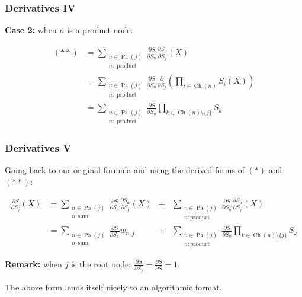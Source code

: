 \documentclass{beamer}
\DeclareMathOperator*{\Ch}{\text{Ch}}
\DeclareMathOperator*{\Pa}{\text{Pa}}
\newcommand{\ddspn}[2]{\frac{\partial#1}{\partial#2}}
\begin{document}
\begin{frame}
  \frametitle{Derivatives IV}

  \textbf{Case 2:} when $n$ is a product node.

  \begin{align*}
    (\ast\ast)&=\sum_{\substack{n\in\Pa(j)\\n:\text{ product}}}\ddspn{S}{S_n}\ddspn{S_n}{S_j}(X)\\
      &=\sum_{\substack{n\in\Pa(j)\\n:\text{ product}}}\ddspn{S}{S_n}\ddspn{}{S_j}\left(\prod_{i\in\Ch(n)}
      S_i(X)\right)\\
      &=\sum_{\substack{n\in\Pa(j)\\n:\text{ product}}}\ddspn{S}{S_n}\prod_{k\in
      \Ch(n)\setminus\{j\}}S_k
  \end{align*}
\end{frame}

\begin{frame}
  \frametitle{Derivatives V}

  Going back to our original formula and using the derived forms of $(\ast)$ and $(\ast\ast)$:

  \begin{align*}
    \ddspn{S}{S_j}(X)&=\sum_{\substack{n\in\Pa(j)\\n:\text{
          sum}}}\ddspn{S}{S_n}\ddspn{S_n}{S_j}(X)&+&\sum_{\substack{n\in\Pa(j)\\n:\text{
      product}}}\ddspn{S}{S_n}\ddspn{S_n}{S_j}(X)\\
                     &=\sum_{\substack{n\in\Pa(j)\\n:\text{
          sum}}}\ddspn{S}{S_n}w_{n,j}&+&\sum_{\substack{n\in\Pa(j)\\n:\text{
                       product}}}\ddspn{S}{S_n}\prod_{k\in \Ch(n)\setminus\{j\}}S_k
  \end{align*}

  \begin{center}
    \textbf{Remark:} when $j$ is the root node: $\ddspn{S}{S_j}=\ddspn{S}{S}=1$.
  \end{center}

  The above form lends itself nicely to an algorithmic format.
\end{frame}
\end{document}
